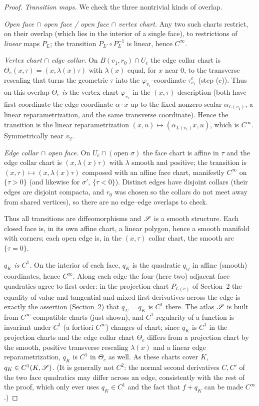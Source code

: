 \begin{proof}
\emph{Transition maps.} We check the three nontrivial kinds of overlap.

\textit{Open face $\cap$ open face / open face $\cap$ vertex chart.} Any two such
charts restrict, on their overlap (which lies in the interior of a single face),
to restrictions of \emph{linear} maps $P_L$; the transition $P_{L'}\circ P_L^{-1}$
is linear, hence $C^\infty$.

\textit{Vertex chart $\cap$ edge collar.} On $B(v_1,r_0)\cap U_e$ the edge collar
chart is $\Theta_e(x,\tau)=(x,\lambda(x)\tau)$ with $\lambda(x)$ equal, for $x$
near $0$, to the transverse rescaling that turns the geometric $\tau$ into the
$\varphi_{v_1}$-coordinate $\tau_{v_1}^e$ (step (c)). Thus on this overlap
$\Theta_e$ \emph{is} the vertex chart $\varphi_{v_1}$ in the $(x,\tau)$ description
(both have first coordinate the edge coordinate $\alpha\cdot x$ up to the fixed
nonzero scalar $\alpha_{L(v_1)}$, a linear reparametrization, and the same
transverse coordinate). Hence the transition is the linear reparametrization
$(x,u)\mapsto(\alpha_{L(v_1)}x,u)$, which is $C^\infty$. Symmetrically near $v_2$.

\textit{Edge collar $\cap$ open face.} On $U_e\cap(\text{open }\sigma)$ the face
chart is affine in $\tau$ and the edge collar chart is $(x,\lambda(x)\tau)$ with
$\lambda$ smooth and positive; the transition is $(x,\tau)\mapsto(x,\lambda(x)\tau)$
composed with an affine face chart, manifestly $C^\infty$ on $\{\tau>0\}$ (and
likewise for $\sigma'$, $\{\tau<0\}$). Distinct edges have disjoint collars (their
edges are disjoint compacta, and $r_0$ was chosen so the collars do not meet away
from shared vertices), so there are no edge--edge overlaps to check.

Thus all transitions are diffeomorphisms and $\mathscr S$ is a smooth structure. Each
closed face is, in its own affine chart, a linear polygon, hence a smooth manifold
with corners; each open edge is, in the $(x,\tau)$ collar chart, the smooth arc
$\{\tau=0\}$.

\emph{$q_K$ is $C^1$.} On the interior of each face, $q_K$ is the quadratic
$q_{ij}$ in affine (smooth) coordinates, hence $C^\infty$. Along each edge the four
(here two) adjacent face quadratics agree to first order: in the projection chart
$P_{L(v)}$ of Section~2 the equality of value and tangential and mixed first
derivatives across the edge is exactly the assertion (Section~2) that
$q_\Sigma=q_K$ is $C^1$ there. The atlas $\mathscr S$ is built from
$C^\infty$-compatible charts (just shown), and $C^1$-regularity of a function is
invariant under $C^1$ (a fortiori $C^\infty$) changes of chart; since $q_K$ is
$C^1$ in the projection charts and the edge collar chart $\Theta_e$ differs from a
projection chart by the smooth, positive transverse rescaling $\lambda(x)$ and a
linear edge reparametrization, $q_K$ is $C^1$ in $\Theta_e$ as well. As these
charts cover $K$, $q_K\in C^1(K,\mathscr S)$. (It is generally not $C^2$: the normal
second derivatives $C,C'$ of the two face quadratics may differ across an edge,
consistently with the rest of the proof, which only ever uses $q_K\in C^1$ and the
fact that $f+q_K$ can be made $C^\infty$.)
\end{proof}

